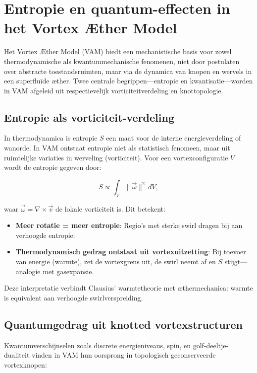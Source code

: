 
\section{Entropie en quantum-effecten in het Vortex Æther Model}

Het Vortex Æther Model (VAM) biedt een mechanistische basis voor zowel thermodynamische als kwantummechanische fenomenen, niet door postulaten over abstracte toestandsruimten, maar via de dynamica van knopen en wervels in een superfluïde æther. Twee centrale begrippen—entropie en kwantisatie—worden in VAM afgeleid uit respectievelijk vorticiteitverdeling en knottopologie.

\subsection{Entropie als vorticiteit-verdeling}

In thermodynamica is entropie $S$ een maat voor de interne energieverdeling of wanorde. In VAM ontstaat entropie niet als statistisch fenomeen, maar uit ruimtelijke variaties in werveling (vorticiteit). Voor een vortexconfiguratie $V$ wordt de entropie gegeven door:

\begin{equation}
S \propto \int_V \|\vec{\omega}\|^2 \, dV,
\end{equation}

waar $\vec{\omega} = \nabla \times \vec{v}$ de lokale vorticiteit is. Dit betekent:

\begin{itemize}
    \item \textbf{Meer rotatie = meer entropie}: Regio's met sterke swirl dragen bij aan verhoogde entropie.
    \item \textbf{Thermodynamisch gedrag ontstaat uit vortexuitzetting}: Bij toevoer van energie (warmte), zet de vortexgrens uit, de swirl neemt af en $S$ stijgt—analogie met gasexpansie.
\end{itemize}

Deze interpretatie verbindt Clausius’ warmtetheorie met æthermechanica: warmte is equivalent aan verhoogde swirlverspreiding.

\subsection{Quantumgedrag uit knotted vortexstructuren}

Kwantumverschijnselen zoals discrete energieniveaus, spin, en golf-deeltje-dualiteit vinden in VAM hun oorsprong in topologisch geconserveerde vortexknopen:


